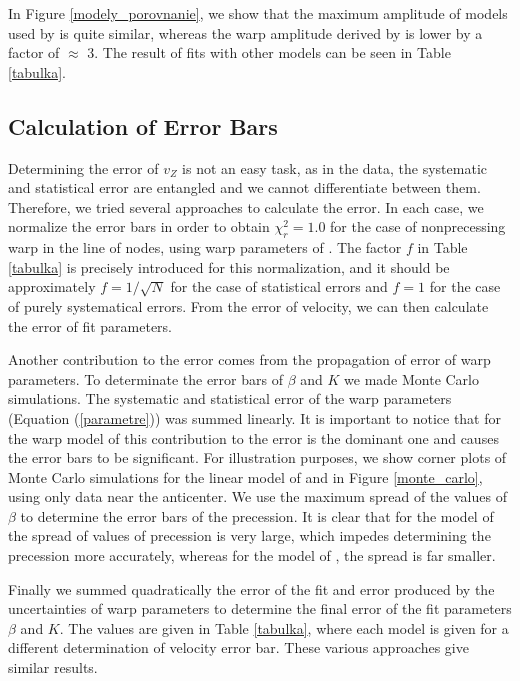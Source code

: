 \documentclass[twocolumn]{aastex63}
\begin{document}
In Figure \ref{modely_porovnanie}, we show that the maximum amplitude of models used by  is quite similar, whereas the warp amplitude derived by  \cite{zofi} is lower by a factor of $\approx$ 3. The result of fits with other models can be seen in Table \ref{tabulka}.

\subsection{Calculation of Error Bars}\label{errors}
Determining the error of $v_Z$ is not an easy task, as in the data, the systematic and statistical error are entangled and we cannot differentiate between them. Therefore, we tried several approaches to calculate the error. In each case, we normalize the error bars in order to obtain $\chi_r^2=1.0$ for the case of nonprecessing warp in the line of nodes, using warp parameters of \cite{zofi}. The factor $f$ in Table \ref{tabulka} is precisely introduced for this normalization, and it should be approximately $f=1/\sqrt{N}$ for the case of statistical errors and $f=1$ for the case of purely systematical errors. From the error of velocity, we can then calculate the error of fit parameters. 

Another contribution to the error comes from the propagation of error of warp parameters. To determinate the error bars of $\beta$ and $K$ we made Monte Carlo simulations. The systematic and statistical error of the warp parameters (Equation (\ref{parametre})) was summed linearly. It is important to notice that for the warp model of \cite{zofi} this contribution to the error is the dominant one and causes the error bars to be significant. For illustration purposes, we show corner plots of Monte Carlo simulations for the linear model of \cite{chen} and \cite{zofi} in Figure \ref{monte_carlo}, using only data near the anticenter. We use the maximum spread of the values of $\beta$ to determine the error bars of the precession. It is clear that for the model of \cite{zofi} the spread of values of precession is very large, which impedes determining the precession more accurately, whereas for the model of \cite{chen}, the spread is far smaller.

Finally we summed quadratically the error of the fit and error produced by the uncertainties of warp parameters to determine the final error of the fit parameters $\beta$ and $K$. The values are given in Table \ref{tabulka}, where each model is given for a different determination of velocity error bar. These various approaches give similar results.
\end{document}
